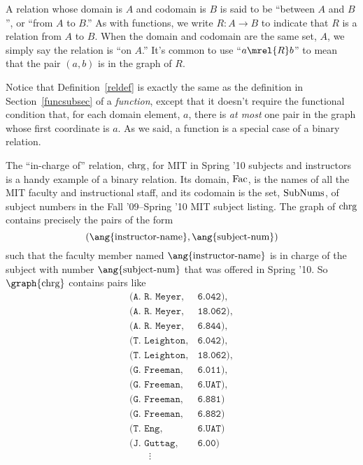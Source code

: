 A relation whose domain is $A$ and codomain is $B$ is said to be ``between
$A$ and $B$'', or ``from $A$ to $B$.''  As with functions, we write $R: A
\to B$ to indicate that $R$ is a relation from $A$ to $B$.  When the
domain and codomain are the same set, $A$, we simply say the
 relation is ``on $A$.''  It's common to use
 ``$a \mrel{R} b$'' to mean that the pair $(a,b)$ is
in the graph of $R$.

Notice that Definition~\ref{reldef} is exactly the same as the definition
in Section~\ref{funcsubsec} of a {\emph{function}}, except that it doesn't
require the functional condition that, for each domain element, $a$, there
is \emph{at most} one pair in the graph whose first coordinate is $a$.  As
we said, a function is a special case of a binary relation.

The ``in-charge of'' relation, $\text{chrg}$, for MIT in Spring '10 subjects
and instructors is a handy example of a binary relation.  Its domain,
$\text{Fac}$, is the names of all the MIT faculty and instructional staff,
and its codomain is the set, $\text{SubNums}$, of subject numbers in the
Fall '09--Spring '10 MIT subject listing.  The graph of $\text{chrg}$ contains
precisely the pairs of the form
\[
(\ang{\text{instructor-name}}, \ang{\text{subject-num}})
\]
such that the faculty member named $\ang{\text{instructor-name}}$ is in
charge of the subject with number $\ang{\text{subject-num}}$ that was
offered in Spring '10.  So $\graph{\inchrg}$ contains pairs like
\[\begin{array}{ll}
(\texttt{A. R. Meyer}, & \texttt{6.042}),\\
(\texttt{A. R. Meyer}, & \texttt{18.062}),\\
(\texttt{A. R. Meyer}, & \texttt{6.844}),\\
(\texttt{T. Leighton}, & \texttt{6.042}),\\
(\texttt{T. Leighton}, & \texttt{18.062}),\\
(\texttt{G. Freeman}, & \texttt{6.011}),\\
(\texttt{G. Freeman}, & \texttt{6.UAT}),\\
(\texttt{G. Freeman}, & \texttt{6.881})\\
(\texttt{G. Freeman}, & \texttt{6.882})\\
(\texttt{T. Eng},      & \texttt{6.UAT})\\
(\texttt{J. Guttag},  & \texttt{6.00})\\
\qquad \vdots
\end{array}\]

